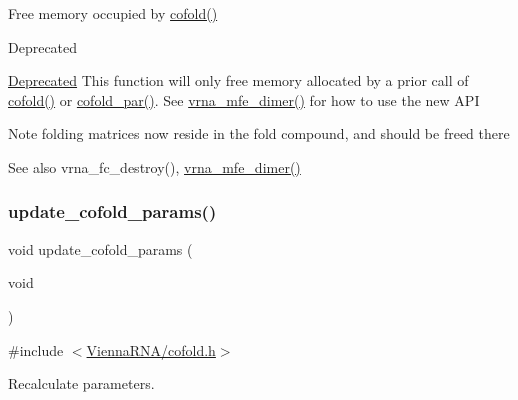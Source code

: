 Free memory occupied by \mbox{\hyperlink{group__mfe__global__deprecated_gabc8517f22cfe70595ee81fc837910d52}{cofold()}} 

\begin{DoxyRefDesc}{Deprecated}
\item[\mbox{\hyperlink{deprecated__deprecated000032}{Deprecated}}]This function will only free memory allocated by a prior call of \mbox{\hyperlink{group__mfe__global__deprecated_gabc8517f22cfe70595ee81fc837910d52}{cofold()}} or \mbox{\hyperlink{group__mfe__global__deprecated_ga7612cfeeb1b793f1e4179b1eb53df1f3}{cofold\+\_\+par()}}. See \mbox{\hyperlink{group__mfe__global_gaab22d10c1190f205f16a77cab9d5d3ee}{vrna\+\_\+mfe\+\_\+dimer()}} for how to use the new A\+PI\end{DoxyRefDesc}


\begin{DoxyNote}{Note}
folding matrices now reside in the fold compound, and should be free\textquotesingle{}d there 
\end{DoxyNote}
\begin{DoxySeeAlso}{See also}
vrna\+\_\+fc\+\_\+destroy(), \mbox{\hyperlink{group__mfe__global_gaab22d10c1190f205f16a77cab9d5d3ee}{vrna\+\_\+mfe\+\_\+dimer()}} 
\end{DoxySeeAlso}
\mbox{\label{group__mfe__global__deprecated_ga4fcbf34e77b99bfbb2333d2ab0c41a57}} 
\subsubsection{\texorpdfstring{update\_cofold\_params()}{update\_cofold\_params()}}
{\footnotesize\ttfamily void update\+\_\+cofold\+\_\+params (\begin{DoxyParamCaption}\item[{void}]{ }\end{DoxyParamCaption})}



{\ttfamily \#include $<$\mbox{\hyperlink{cofold_8h}{Vienna\+R\+N\+A/cofold.\+h}}$>$}



Recalculate parameters. 

